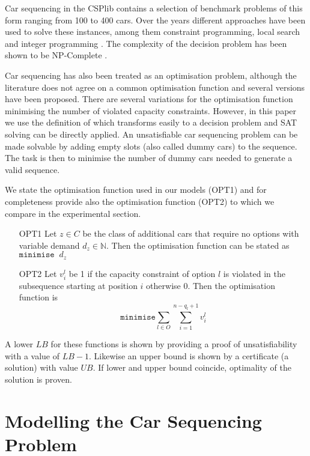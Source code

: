 \documentclass[]{llncs}
\def\min{{\texttt{minimise}}}
\begin{document}
Car sequencing in the CSPlib contains a selection of benchmark problems of this form ranging from 100 to 400 cars. Over
the years different approaches have been used to solve these instances, among them constraint programming, local search
and integer programming \cite{Regin97}\cite{Gottlieb03}\cite{Gravel05}\cite{Estellon06}\cite{Siala12}. The complexity of
the decision problem has been shown to be NP-Complete \cite{Kis04}\cite{Gent98}. 

Car sequencing has also been treated as an optimisation problem, although the literature does not agree on a common
optimisation function and several versions have been proposed. There are several variations for the optimisation
function minimising the number of violated capacity constraints. However, in this paper we use the definition of
\cite{Perron04} which transforms easily to a decision problem and SAT solving can be directly applied. 
An unsatisfiable car sequencing problem can be made solvable by adding empty slots (also called dummy cars) to
the sequence. The task is then to minimise the number of dummy cars needed to generate a valid sequence.
          
We state the optimisation function used in our models (OPT1) and for completeness provide also the optimisation function
(OPT2) to which we compare in the experimental section. 

\begin{itemize} 
    \item[OPT1] Let $z\in C$ be the class of additional cars that require no options with variable demand $d_z \in
    \mathbb{N}$. Then the optimisation function can be stated as $\min \;\; d_z$
    \item[OPT2] Let $v^l_{i}$ be 1 if the capacity constraint of option $l$ is violated in the subsequence starting at
        position $i$ otherwise 0. Then the optimisation function is $$\min \sum_{l\in O} \sum_{i=1}^{n-q_l+1} v_i^l$$
\end{itemize} 

A lower $LB$ for these functions is shown by providing a proof of unsatisfiability with a value of $LB-1$. Likewise an
upper bound is shown by a certificate (a solution) with value $UB$. If lower and upper bound coincide, optimality of the
solution is proven. 

\section{Modelling the Car Sequencing Problem}
\label{sec:modelling}
\end{document}
